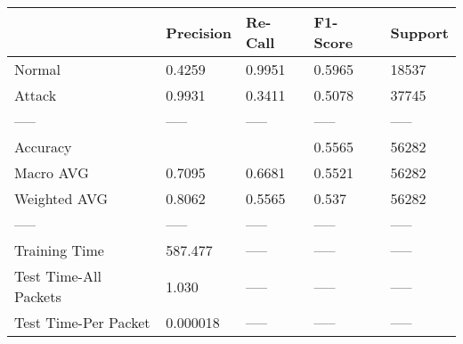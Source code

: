 \begin{tabular}{lllll}
\toprule
{} & Precision & Re-Call & F1-Score & Support \\
\midrule
Normal                &    0.4259 &  0.9951 &   0.5965 &   18537 \\
Attack                &    0.9931 &  0.3411 &   0.5078 &   37745 \\
-----                 &     ----- &   ----- &    ----- &   ----- \\
Accuracy              &           &         &   0.5565 &   56282 \\
Macro AVG             &    0.7095 &  0.6681 &   0.5521 &   56282 \\
Weighted AVG          &    0.8062 &  0.5565 &    0.537 &   56282 \\
-----                 &     ----- &   ----- &    ----- &   ----- \\
Training Time         &   587.477 &   ----- &    ----- &   ----- \\
Test Time-All Packets &     1.030 &   ----- &    ----- &   ----- \\
Test Time-Per Packet  &  0.000018 &   ----- &    ----- &   ----- \\
\bottomrule
\end{tabular}
